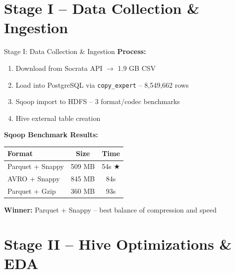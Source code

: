 \documentclass[10pt]{beamer}
\begin{document}
\section{Stage I -- Data Collection \& Ingestion}

\begin{frame}{Stage I: Data Collection \& Ingestion}
\textbf{Process:}
\begin{enumerate}
    \item Download from Socrata API $\rightarrow$ 1.9 GB CSV
    \item Load into PostgreSQL via \texttt{copy\_expert} -- 8,549,662 rows
    \item Sqoop import to HDFS -- 3 format/codec benchmarks
    \item Hive external table creation
\end{enumerate}

\vspace{0.3cm}
\textbf{Sqoop Benchmark Results:}
\begin{table}
\centering
\begin{tabular}{lcc}
\toprule
\textbf{Format} & \textbf{Size} & \textbf{Time} \\
\midrule
Parquet + Snappy & 509 MB & 54s $\bigstar$ \\
AVRO + Snappy & 845 MB & 84s \\
Parquet + Gzip & 360 MB & 93s \\
\bottomrule
\end{tabular}
\end{table}

\textbf{Winner:} Parquet + Snappy -- best balance of compression and speed
\end{frame}

\section{Stage II -- Hive Optimizations \& EDA}
\end{document}
